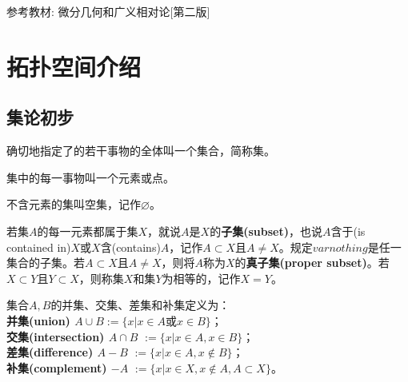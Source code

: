 \documentclass[a4paper]{article}
\begin{document}
\maketitle
\vspace*{10cm}
\begin{center}
    \large{参考教材:} 微分几何和广义相对论[第二版]
\end{center}
\thispagestyle{empty}

\newpage
\tableofcontents
\thispagestyle{empty}

\newpage
\setcounter{page}{1}

\section{拓扑空间介绍}
\subsection{集论初步}

\begin{concept}
    确切地指定了的若干事物的全体叫一个集合，简称集。
\end{concept}
\begin{concept}
    集中的每一事物叫一个元素或点。
\end{concept}

\begin{concept}
    不含元素的集叫空集，记作$ \varnothing  $。
\end{concept}

\begin{ndefi}
    若集$ A $的每一元素都属于集$ X $，就说$ A $是$ X $的\textbf{子集(subset)}，也说$ A $含于(is contained in)$ X $或$ X $含(contains)$ A $，记作$ A \subset X $且$ A \neq X $。规定$ varnothing $是任一集合的子集。若$ A \subset X $且$ A \neq X $，则将$ A $称为$ X $的\textbf{真子集(proper subset)}。若$ X \subset Y $且$ Y \subset X $，则称集$ X $和集$ Y $为相等的，记作$ X = Y $。
\end{ndefi}

\begin{ndefi}
    集合$ A,B $的并集、交集、差集和补集定义为： \\
    \textbf{并集(union) $ A \cup B $}$ :=\{x | x \in A \text{或} x \in B\} $； \\
    \textbf{交集(intersection) $ A \cap B $} $ := \{x | x \in A, x \in B \} $； \\
    \textbf{差集(difference) $ A - B $} $ :=\{ x | x \in A, x \notin B \} $； \\
    \textbf{补集(complement) $ -A $} $ := \{ x | x \in X, x \notin A, A \subset X \} $。
\end{ndefi}
\end{document}
